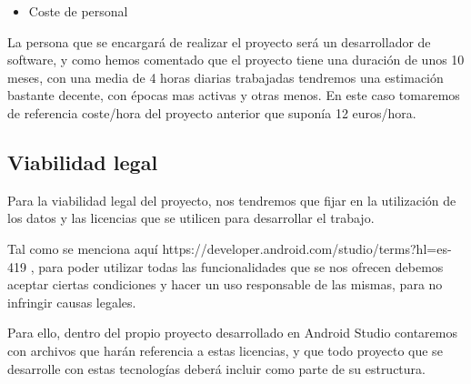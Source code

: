 \begin{itemize}
\item Coste de personal
\end{itemize}

La persona que se encargará de realizar el proyecto será un desarrollador de software, y como hemos comentado que el proyecto tiene una duración de unos 10 meses, con una media de 4 horas diarias trabajadas tendremos una estimación bastante decente, con épocas mas activas y otras menos. En este caso tomaremos de referencia coste/hora del proyecto anterior que suponía 12 euros/hora.

\subsection{Viabilidad legal}

Para la viabilidad legal del proyecto, nos tendremos que fijar en la utilización de los datos y las licencias que se utilicen para desarrollar el trabajo.

Tal como se menciona aquí https://developer.android.com/studio/terms?hl=es-419 , para poder utilizar todas las funcionalidades que se nos ofrecen debemos aceptar ciertas condiciones y hacer un uso responsable de las mismas, para no infringir causas legales.

Para ello, dentro del propio proyecto desarrollado en Android Studio contaremos con archivos que harán referencia a estas licencias, y que todo proyecto que se desarrolle con estas tecnologías deberá incluir como parte de su estructura.


